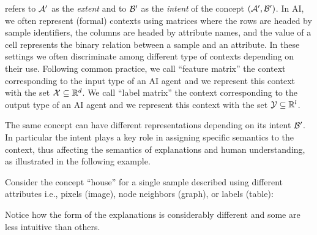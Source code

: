 \citet{ganter1997formal} refers to $\mathcal{A}'$ as the \textit{extent} and to $\mathcal{B}'$ as the \textit{intent} of the concept $(\mathcal{A}',\mathcal{B}')$. In AI, we often represent (formal) contexts using matrices where the rows are headed by sample identifiers, the columns are headed by attribute names, and the value of a cell represents the binary relation between a sample and an attribute. In these settings we often discriminate among different type of contexts depending on their use. Following common practice, we call ``feature matrix'' the context corresponding to the input type of an AI agent and we represent this context with the set $\mathcal{X} \subseteq \mathbb{R}^{d}$. We call ``label matrix'' the context corresponding to the output type of an AI agent and we represent this context with the set $\mathcal{Y} \subseteq \mathbb{R}^{l}$. 
\begin{remark}
The same concept can have different representations depending on its intent $\mathcal{B}'$. In particular the intent plays a key role in assigning specific semantics to the context, thus affecting the semantics of explanations and human understanding, as illustrated in the following example.
\end{remark}
\begin{example}
Consider the concept ``house'' for a single sample described using different attributes i.e., pixels (image), node neighbors (graph), or labels (table):
\begin{figure}[H]
    \centering
    \label{fig:my_label}
\end{figure}
Notice how the form of the explanations is considerably different and some are less intuitive than others.
\end{example}
